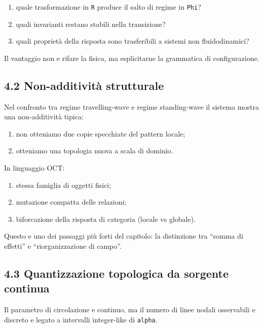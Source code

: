 \begin{enumerate}
\def\labelenumi{\arabic{enumi}.}
\tightlist
\item
  quale trasformazione in \texttt{R} produce il salto di regime in \texttt{Phi}?
\item
  quali invarianti restano stabili nella transizione?
\item
  quali proprietà della risposta sono trasferibili a sistemi non fluidodinamici?
\end{enumerate}

Il vantaggio non e rifare la fisica, ma esplicitarne la grammatica di configurazione.

\subsection{4.2 Non-additività strutturale}

Nel confronto tra regime travelling-wave e regime standing-wave il sistema mostra una non-additività tipica:

\begin{enumerate}
\def\labelenumi{\arabic{enumi}.}
\tightlist
\item
  non otteniamo due copie specchiate del pattern locale;
\item
  otteniamo una topologia nuova a scala di dominio.
\end{enumerate}

In linguaggio OCT:

\begin{enumerate}
\def\labelenumi{\arabic{enumi}.}
\tightlist
\item
  stessa famiglia di oggetti fisici;
\item
  mutazione compatta delle relazioni;
\item
  biforcazione della risposta di categoria (locale vs globale).
\end{enumerate}

Questo e uno dei passaggi più forti del capitolo: la distinzione tra ``somma di effetti'' e ``riorganizzazione di campo''.

\subsection{4.3 Quantizzazione topologica da sorgente continua}

Il parametro di circolazione e continuo, ma il numero di linee nodali osservabili e discreto e legato a intervalli integer-like di \texttt{\textbar{}alpha\textbar{}}.

